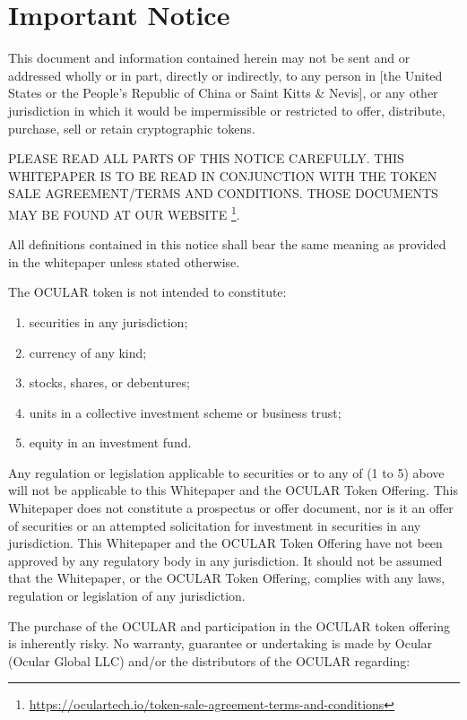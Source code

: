\documentclass[a4paper]{article}
\begin{document}
\pagebreak

\tableofcontents

\pagebreak

\section{Important Notice}
This document and information contained herein may not be sent and or addressed wholly or in part, directly or indirectly, to any person in [the United States or the People’s Republic of China or Saint Kitts \& Nevis], or any other jurisdiction in which it would be impermissible or restricted to offer, distribute, purchase, sell or retain cryptographic tokens.

PLEASE READ ALL PARTS OF THIS NOTICE CAREFULLY. THIS WHITEPAPER IS TO BE READ IN CONJUNCTION WITH THE TOKEN SALE AGREEMENT/TERMS AND CONDITIONS. THOSE DOCUMENTS MAY BE FOUND AT OUR WEBSITE \footnote{\url{https://oculartech.io/token-sale-agreement-terms-and-conditions}}.

All definitions contained in this notice shall bear the same meaning as provided in the whitepaper unless stated otherwise.

The OCULAR token is not intended to constitute:
\begin{enumerate}
\item securities in any jurisdiction;
\item currency of any kind;
\item stocks, shares, or debentures;
\item units in a collective investment scheme or business trust;
\item equity in an investment fund.
\end{enumerate}

Any regulation or legislation applicable to securities or to any of (1 to 5) above will not be applicable to this Whitepaper and the OCULAR Token Offering. This Whitepaper does not constitute a prospectus or offer document, nor is it an offer of securities or an attempted solicitation for investment in securities in any jurisdiction. This Whitepaper and the OCULAR Token Offering have not been approved by any regulatory body in any jurisdiction. It should not be assumed that the Whitepaper, or the OCULAR Token Offering, complies with any laws, regulation or legislation of any jurisdiction.

The purchase of the OCULAR and participation in the OCULAR token offering is inherently risky. No warranty, guarantee or undertaking is made by Ocular (Ocular Global LLC) and/or the distributors of the OCULAR regarding:
\end{document}
